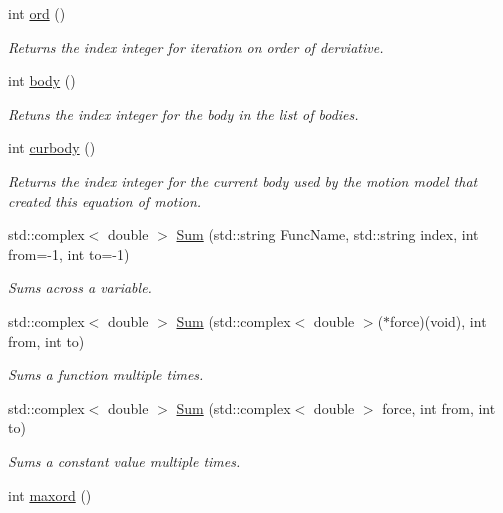 \begin{DoxyCompactItemize}
int \hyperlink{classosea_1_1ofreq_1_1_equationof_motion_a31f904818ce75c9e2a2b5cff9fc707a5}{ord} ()
\begin{DoxyCompactList}\small\item\em Returns the index integer for iteration on order of derviative. \end{DoxyCompactList}\item 
int \hyperlink{classosea_1_1ofreq_1_1_equationof_motion_ac87fe1d5112f5b42f9afd5f1c3b9002c}{body} ()
\begin{DoxyCompactList}\small\item\em Retuns the index integer for the body in the list of bodies. \end{DoxyCompactList}\item 
int \hyperlink{classosea_1_1ofreq_1_1_equationof_motion_a2fd7f9778dced5bba0d362841cf182a7}{curbody} ()
\begin{DoxyCompactList}\small\item\em Returns the index integer for the current body used by the motion model that created this equation of motion. \end{DoxyCompactList}\item 
std\-::complex$<$ double $>$ \hyperlink{classosea_1_1ofreq_1_1_equationof_motion_a5907d782ee639d5ec24515ed21050851}{Sum} (std\-::string Func\-Name, std\-::string index, int from=-\/1, int to=-\/1)
\begin{DoxyCompactList}\small\item\em Sums across a variable. \end{DoxyCompactList}\item 
std\-::complex$<$ double $>$ \hyperlink{classosea_1_1ofreq_1_1_equationof_motion_ab255de5deaef7394c788bb68a432aec0}{Sum} (std\-::complex$<$ double $>$($\ast$force)(void), int from, int to)
\begin{DoxyCompactList}\small\item\em Sums a function multiple times. \end{DoxyCompactList}\item 
std\-::complex$<$ double $>$ \hyperlink{classosea_1_1ofreq_1_1_equationof_motion_a44797e6d9ebed0de563ac08d15f8035f}{Sum} (std\-::complex$<$ double $>$ force, int from, int to)
\begin{DoxyCompactList}\small\item\em Sums a constant value multiple times. \end{DoxyCompactList}\item 
int \hyperlink{classosea_1_1ofreq_1_1_equationof_motion_ad8271e1cc1d78b7bf80a90fe3c3b06b4}{maxord} ()

\end{DoxyCompactItemize}
